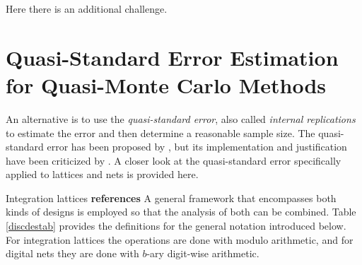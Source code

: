 \documentclass[graybox]{svmult}
\begin{document}
Here there is an additional challenge.  

\section{Quasi-Standard Error Estimation for Quasi-Monte Carlo Methods} \label{qmcqsesec}

An alternative is to use the \emph{quasi-standard error}, also called \emph{internal replications} to estimate the error and then determine a reasonable sample size.  The quasi-standard error has been proposed by \cite{Hal05a}, but its implementation and justification have been criticized by \cite{Owe06a}.  A closer look at the quasi-standard error specifically applied to lattices and nets is provided here. 

Integration lattices {\bf references} A general framework that encompasses both kinds of designs is employed so that the analysis of both can be combined.  Table \ref{discdestab} provides the definitions for the general notation introduced below.  For integration lattices the operations are done with modulo arithmetic, and for digital nets they are done with $b$-ary digit-wise arithmetic.
\end{document}
